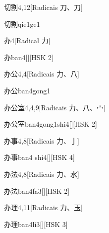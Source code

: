 \begin{entry}{切割}{4,12}[Radicais ⼑、⼑]
  \begin{phonetics}{切割}{qie1ge1}
  \end{phonetics}
\end{entry}

\begin{entry}{办}{4}[Radical ⼒]
  \begin{phonetics}{办}{ban4}[][HSK 2]
  \end{phonetics}
\end{entry}

\begin{entry}{办公}{4,4}[Radicais ⼒、⼋]
  \begin{phonetics}{办公}{ban4gong1}
  \end{phonetics}
\end{entry}

\begin{entry}{办公室}{4,4,9}[Radicais ⼒、⼋、⼧]
  \begin{phonetics}{办公室}{ban4gong1shi4}[][HSK 2]
  \end{phonetics}
\end{entry}

\begin{entry}{办事}{4,8}[Radicais ⼒、⼅]
  \begin{phonetics}{办事}{ban4 shi4}[][HSK 4]
  \end{phonetics}
\end{entry}

\begin{entry}{办法}{4,8}[Radicais ⼒、⽔]
  \begin{phonetics}{办法}{ban4fa3}[][HSK 2]
  \end{phonetics}
\end{entry}

\begin{entry}{办理}{4,11}[Radicais ⼒、⽟]
  \begin{phonetics}{办理}{ban4li3}[][HSK 3]
  \end{phonetics}
\end{entry}

